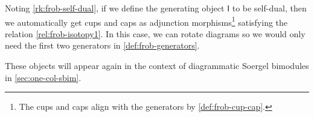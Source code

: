 \begin{remark}
    Noting \autoref{rk:frob-self-dual}, if we define the generating object $\mathsf{I}$ to be self-dual, then we automatically get cups and caps as adjunction morphisms\footnote{The cups and caps align with the generators by \eqref{def:frob-cup-cap}.} satisfying the relation \eqref{rel:frob-isotopy1}. In this case, we can rotate diagrams so we would only need the first two generators in \eqref{def:frob-generators}.
\end{remark}

These objects will appear again in the context of diagrammatic Soergel bimodules in \autoref{sec:one-col-sbim}.
